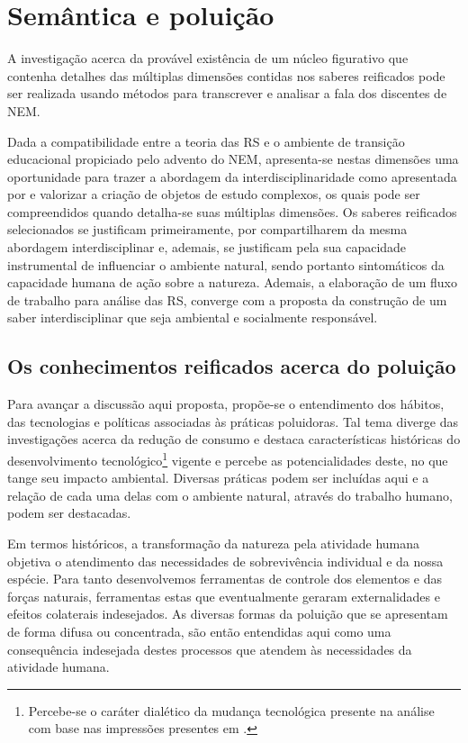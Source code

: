 \documentclass[
  12pt,       %
  openright,      %
  twoside,      %
  a4paper,      %
  english,      %
  french,       %
  spanish,      %
  brazil        %
  ]{abntex2}
\begin{document}
\chapter{Semântica e poluição}

A investigação acerca da provável existência de um núcleo figurativo que contenha detalhes das múltiplas dimensões contidas nos saberes reificados pode ser realizada usando métodos para transcrever e analisar a fala dos discentes de NEM. 

Dada a compatibilidade entre a teoria das RS e o ambiente de transição educacional propiciado pelo advento do NEM, apresenta-se nestas dimensões uma oportunidade para trazer a abordagem da interdisciplinaridade como apresentada por  e valorizar a criação de objetos de estudo complexos, os quais pode ser compreendidos quando detalha-se suas múltiplas dimensões. Os saberes reificados selecionados se justificam primeiramente, por compartilharem da mesma abordagem interdisciplinar e, ademais, se justificam pela sua capacidade instrumental de influenciar o ambiente natural, sendo portanto sintomáticos da capacidade humana de ação sobre a natureza. Ademais, a elaboração de um fluxo de trabalho para análise das RS, converge com a proposta da construção de um saber interdisciplinar que seja ambiental e socialmente responsável. 






\section{Os conhecimentos reificados acerca do poluição}

Para avançar a discussão aqui proposta, propõe-se o entendimento dos hábitos, das tecnologias e políticas associadas às práticas poluidoras. Tal tema diverge das investigações acerca da redução de consumo e destaca características históricas do desenvolvimento tecnológico\footnote{Percebe-se o caráter dialético da mudança tecnológica presente na análise com base nas impressões presentes em .} vigente e percebe as potencialidades deste, no que tange seu impacto ambiental. Diversas práticas podem ser incluídas aqui e a relação de cada uma delas com o ambiente natural, através do trabalho humano, podem ser destacadas.

Em termos históricos, a transformação da natureza pela atividade humana objetiva o atendimento das necessidades de sobrevivência individual e da nossa espécie. Para tanto desenvolvemos ferramentas de controle dos elementos e das forças naturais, ferramentas estas que eventualmente geraram externalidades e efeitos colaterais indesejados. As diversas formas da poluição que se apresentam de forma difusa ou concentrada, são então entendidas aqui como uma consequência indesejada destes processos que atendem às necessidades da atividade humana. 
\end{document}
